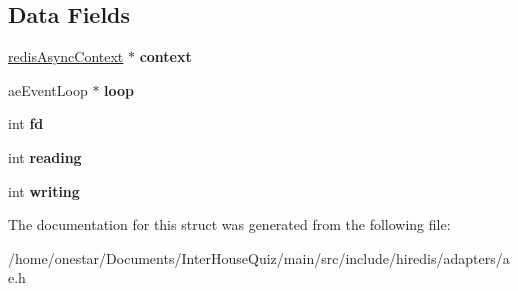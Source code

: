 \subsection*{Data Fields}
\begin{DoxyCompactItemize}
\item 
\hypertarget{structredis_ae_events_a5764ffeda6751a7e3eec0eb29d402bde}{\hyperlink{structredis_async_context}{redis\+Async\+Context} $\ast$ {\bfseries context}}\label{structredis_ae_events_a5764ffeda6751a7e3eec0eb29d402bde}

\item 
\hypertarget{structredis_ae_events_ae87889ddc12a87da6155fdeadaf2c604}{ae\+Event\+Loop $\ast$ {\bfseries loop}}\label{structredis_ae_events_ae87889ddc12a87da6155fdeadaf2c604}

\item 
\hypertarget{structredis_ae_events_a6f8059414f0228f0256115e024eeed4b}{int {\bfseries fd}}\label{structredis_ae_events_a6f8059414f0228f0256115e024eeed4b}

\item 
\hypertarget{structredis_ae_events_a5fa8d7fdcda2ed9555ad800a40a1a810}{int {\bfseries reading}}\label{structredis_ae_events_a5fa8d7fdcda2ed9555ad800a40a1a810}

\item 
\hypertarget{structredis_ae_events_adb2dbc8c43288a024535ed507da7b278}{int {\bfseries writing}}\label{structredis_ae_events_adb2dbc8c43288a024535ed507da7b278}

\end{DoxyCompactItemize}


The documentation for this struct was generated from the following file\+:\begin{DoxyCompactItemize}
\item 
/home/onestar/\+Documents/\+Inter\+House\+Quiz/main/src/include/hiredis/adapters/ae.\+h\end{DoxyCompactItemize}
